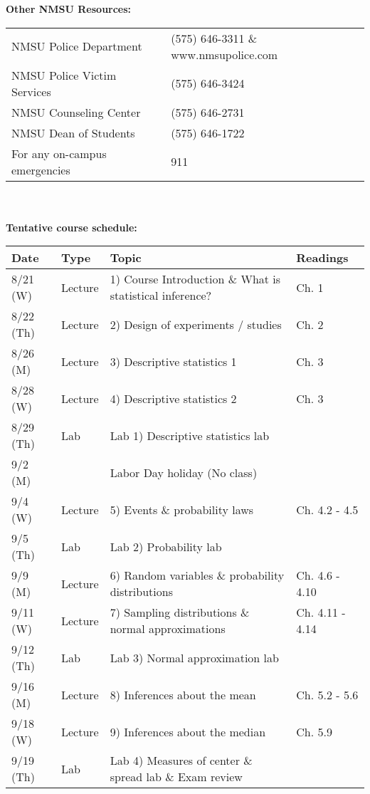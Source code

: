 \documentclass{article}
\begin{document}
\noindent\textbf{Other NMSU Resources:}

\begin{tabular}{p{7cm}p{8cm}}
NMSU Police Department & (575) 646-3311 \& www.nmsupolice.com \\
NMSU Police Victim Services & (575) 646-3424 \\
NMSU Counseling Center & (575) 646-2731 \\
NMSU Dean of Students & (575) 646-1722 \\
For any on-campus emergencies & 911
\end{tabular} \\ \\

\noindent\textbf{Tentative course schedule:}

\begin{center}
	\begin{tabular}{|p{2cm}|p{1.5cm}|p{9cm}|p{2.8cm}|}
		\hline
		Date & Type & Topic & Readings \\ \hline \hline
		8/21 (W) & Lecture & 1) Course Introduction \& What is statistical inference? & Ch. 1 \\ \hline
		8/22 (Th) & Lecture & 2) Design of experiments / studies & Ch. 2 \\ \hline
		8/26 (M) & Lecture & 3) Descriptive statistics 1 & Ch. 3 \\ \hline
		8/28 (W) & Lecture & 4) Descriptive statistics 2 & Ch. 3 \\ \hline
		8/29 (Th) & Lab & Lab 1) Descriptive statistics lab & \\ \hline
		9/2 (M) & & Labor Day holiday (No class) & \\ \hline
		9/4 (W) & Lecture & 5) Events \& probability laws & Ch. 4.2 - 4.5 \\ \hline
		9/5 (Th) & Lab & Lab 2) Probability lab & \\ \hline
		9/9 (M) & Lecture & 6) Random variables \& probability distributions & Ch. 4.6 - 4.10 \\ \hline
		9/11 (W) & Lecture &  7) Sampling distributions \& normal approximations & Ch. 4.11 - 4.14 \\ \hline
		9/12 (Th) & Lab & Lab 3) Normal approximation lab & \\ \hline
		9/16 (M) & Lecture & 8) Inferences about the mean & Ch. 5.2 - 5.6 \\ \hline
		9/18 (W) & Lecture & 9) Inferences about the median & Ch. 5.9 \\ \hline
		9/19 (Th) & Lab & Lab 4) Measures of center \& spread lab \& Exam review & \\ \hline

\end{tabular}
\end{center}
\end{document}
